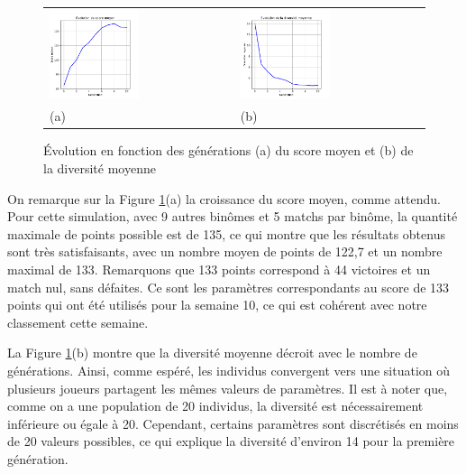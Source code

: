 \documentclass[a4paper,12pt]{article}
\begin{document}
\begin{figure}[ht]
\centering
\begin{tabular}{@{} >{\centering} m{} @{} >{\centering} m{} @{}}
\includegraphics[width=0.5\textwidth]{score_moyen} & \includegraphics[width=0.5\textwidth]{diversite_moyenne} \tabularnewline
(a) & (b) \tabularnewline
\end{tabular}
\caption{Évolution en fonction des générations (a) du score moyen et (b) de la diversité moyenne}
\label{Figure9}
\end{figure}

On remarque sur la Figure \ref{Figure9}(a) la croissance du score moyen, comme attendu. Pour cette simulation, avec 9 autres binômes et 5 matchs par binôme, la quantité maximale de points possible est de 135, ce qui montre que les résultats obtenus sont très satisfaisants, avec un nombre moyen de points de 122,7 et un nombre maximal de 133. Remarquons que 133 points correspond à 44 victoires et un match nul, sans défaites. Ce sont les paramètres correspondants au score de 133 points qui ont été utilisés pour la semaine 10, ce qui est cohérent avec notre classement cette semaine.

La Figure \ref{Figure9}(b) montre que la diversité moyenne décroit avec le nombre de générations. Ainsi, comme espéré, les individus convergent vers une situation où plusieurs joueurs partagent les mêmes valeurs de paramètres. Il est à noter que, comme on a une population de 20 individus, la diversité est nécessairement inférieure ou égale à 20. Cependant, certains paramètres sont discrétisés en moins de 20 valeurs possibles, ce qui explique la diversité d'environ 14 pour la première génération.
\end{document}
